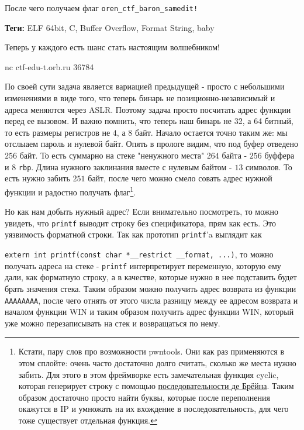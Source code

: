 \documentclass[idxtotoc,hyperref,openany,oneside]{files/pwn} %
\begin{document}
После чего получаем флаг \verb|oren_ctf_baron_samedit!|




\textbf{Теги:} ELF 64bit, C, Buffer Overflow, Format String, baby\vspace{\baselineskip}

\begin{tcolorbox}
Теперь у каждого есть шанс стать настоящим волшебником!

nc ctf-edu-t.orb.ru 36784
\end{tcolorbox}

По своей сути задача является вариацией предыдущей - просто с небольшими изменениями в виде того, что теперь бинарь не позиционно-независимый и адреса меняются через ASLR. Поэтому задача просто посчитать адрес функции перед ее вызовом. И важно помнить, что теперь наш бинарь не 32, а 64 битный, то есть размеры регистров не $4$, а $8$ байт.
Начало остается точно таким же: мы отслыаем пароль и нулевой байт. Опять в прологе видим, что под буфер отведено $256$ байт. То есть суммарно на стеке "ненужного места" $264$ байта - $256$ буффера и $8$ \verb|rbp|. Длина нужного заклинания вместе с нулевым байтом - $13$ символов. То есть нужно забить $251$ байт, после чего можно смело совать адрес нужной функции и радостно получать флаг\footnote{Кстати, пару слов про возможности pwntools. Они как раз применяются в этом сплойте: очень часто достаточно долго считать, сколько же места нужно забить. Для этого в этом фреймворке есть замечательная функция cyclic, которая генерирует строку с помощью \href{https://en.wikipedia.org/wiki/De_Bruijn_sequence}{последовательности де Брёйна}. Таким образом достаточно просто найти буквы, которые после переполнения окажутся в IP и умножать на их вхождение в последовательность, для чего тоже существует отдельная функция.}.

Но как нам добыть нужный адрес? Если внимательно посмотреть, то можно увидеть, что \verb|printf| выводит строку без спецификатора, прям как есть. Это уязвимость форматной строки. Так как прототип \verb|printf|'a выглядит как 

\verb|extern int printf(const char *__restrict __format, ...)|, то можно получать адреса на стеке - \verb|printf| интерпретирует переменную, которую ему дали, как форматную строку, а в качестве, которые нужно в нее подставить будет брать значения стека. Таким образом можно получить адрес возврата из функции \verb|AAAAAAAA|, после чего отнять от этого числа разницу между ее адресом возврата и началом функции WIN и таким образом получить адрес функции WIN, который уже можно перезаписывать на стек и возвращаться по нему.
\end{document}
